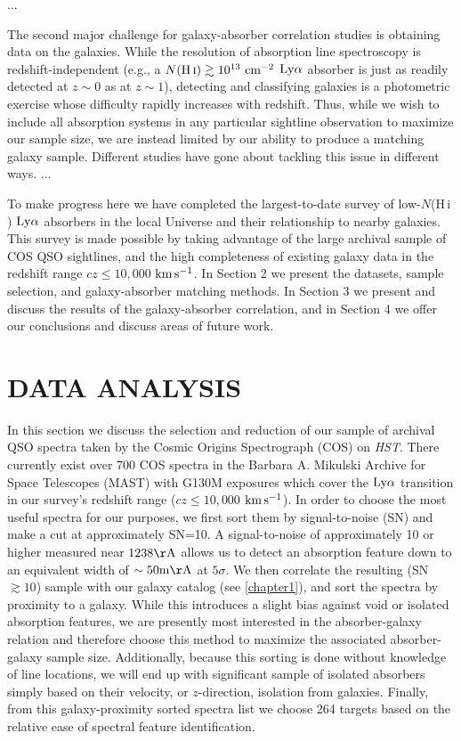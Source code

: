 \documentclass[twocolumn,tighten]{aastex62}
\newcommand{\kms}{$\rm km\, s^{-1}$}
\newcommand{\HI}{\mbox{H\,{\sc i}} }
\begin{document}
...


The second major challenge for galaxy-absorber correlation studies is obtaining data on the galaxies. While the resolution of absorption line spectroscopy is redshift-independent (e.g., a $N(\HI) \gtrsim 10^{13}  ~\rm cm^{-2}$ $\rm Ly\alpha$ absorber is just as readily detected at $z\sim0$ as at $z\sim 1$), detecting and classifying galaxies is a photometric exercise whose difficulty rapidly increases with redshift. Thus, while we wish to include all absorption systems in any particular sightline observation to maximize our sample size, we are instead limited by our ability to produce a matching galaxy sample. Different studies have gone about tackling this issue in different ways. ...


To make progress here we have completed the largest-to-date survey of low-$N$(\HI) $\rm Ly\alpha$ absorbers in the local Universe and their relationship to nearby galaxies. This survey is made possible by taking advantage of the large archival sample of COS QSO sightlines, and the high completeness of existing galaxy data in the redshift range $cz \leq 10,000$ \kms. In Section 2 we present the datasets, sample selection, and galaxy-absorber matching methods. In Section 3 we present and discuss the results of the galaxy-absorber correlation, and in Section 4 we offer our conclusions and discuss areas of future work.



\section{DATA ANALYSIS}
In this section we discuss the selection and reduction of our sample of archival QSO spectra taken by the Cosmic Origins Spectrograph (COS) on \textit{HST}. There currently exist over 700 COS spectra in the Barbara A. Mikulski Archive for Space Telescopes (MAST) with G130M exposures which cover the $\rm Ly\alpha$ transition in our survey's redshift range ($cz \leq 10,000$ \kms). In order to choose the most useful spectra for our purposes, we first sort them by signal-to-noise (SN) and make a cut at approximately SN=10. A signal-to-noise of approximately 10 or higher measured near $\rm 1238 \AA$ allows us to detect an absorption feature down to an equivalent width of $\rm \sim 50 m\AA$ at $5\sigma$. We then correlate the resulting (SN$\gtrsim 10$) sample with our galaxy catalog (see \ref{chapter1}), and sort the spectra by proximity to a galaxy. While this introduces a slight bias against void or isolated absorption features, we are presently most interested in the absorber-galaxy relation and therefore choose this method to maximize the associated absorber-galaxy sample size. Additionally, because this sorting is done without knowledge of line locations, we will end up with significant sample of isolated absorbers simply based on their velocity, or $z$-direction, isolation from galaxies. Finally, from this galaxy-proximity sorted spectra list we choose 264 targets based on the relative ease of spectral feature identification. 
\end{document}
